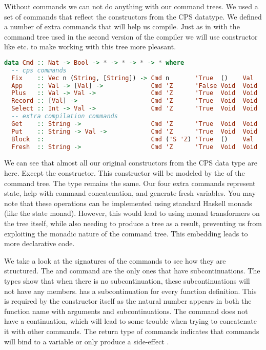 Without commands we can not do anything with our command trees. We used a set of commands that reflect the constructors from the \ac{CPS} datatype. We defined a number of extra commands that will help us compile. Just as in with the command tree used in the second version of the compiler we will use constructor like  etc. to make working with this tree more pleasant.

\begin{lstlisting}[language=Haskell]
data Cmd :: Nat -> Bool -> * -> * -> * -> * where
  -- cps commands
  Fix    :: Vec n (String, [String]) -> Cmd n       'True  ()    Val   ()
  App    :: Val -> [Val] ->             Cmd 'Z      'False Void  Void  Val 
  Plus   :: Val -> Val ->               Cmd 'Z      'True  Void  Void  Val
  Record :: [Val] ->                    Cmd 'Z      'True  Void  Void  Val
  Select :: Int -> Val ->               Cmd 'Z      'True  Void  Void  Val
  -- extra compilation commands        
  Get    :: String ->                   Cmd 'Z      'True  Void  Void  Val
  Put    :: String -> Val ->            Cmd 'Z      'True  Void  Void  ()
  Block  ::                             Cmd ('S 'Z) 'True  ()    Val   Val
  Fresh  :: String ->                   Cmd 'Z      'True  Void  Void  String
\end{lstlisting}

We can see that almost all our original constructors from the \ac{CPS} data type are here. Except the  constructor. This constructor will be modeled by the  of the command tree. The  type remains the same. Our four extra commands represent state, help with command concatenation, and generate fresh variables. You may note that these operations can be implemented using standard Haskell monads (like the state monad). However, this would lead to using monad transformers on the tree itself, while also needing to produce a tree as a result, preventing us from exploiting the monadic nature of the command tree. This embedding leads to more declarative code.

We take a look at the signatures of the commands to see how they are structured. The  and  command are the only ones that have subcontinuations. The  types show that when there is no subcontinuation, these subcontinuations will not have any members.  has a subcontinuation for every function definition. This is required by the constructor itself as the natural number  appears in both the function name with arguments and subcontinuations. The  command does not have a continuation, which will lead to some trouble when trying to concatenate it with other commands. The return type of commands indicates that commands will bind to a variable  or only produce a side-effect \icode{()}.

